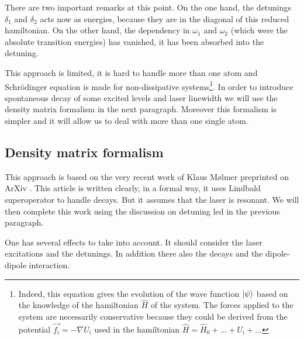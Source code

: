 \documentclass[twoside, open=right
]{scrreprt}
\newcommand{\om}{\omega}
\begin{document}
\par There are two important remarks at this point. On the one hand, the detunings $\delta_1$ and $\delta_2$ acts now as energies, because they are in the diagonal of this reduced hamiltonian. On the other hand, the dependency in $\om_1$ and $\om_2$ (which were the absolute transition energies) has vanished, it has been absorbed into the detuning.

\par This approach is limited, it is hard to handle more than one atom and Schrödinger equation is made for non-dissipative systems\footnote{Indeed, this equation gives the evolution of the wave function $\ket{\psi}$ based on the knowledge of the hamiltonian $\hat{H}$ of the system. The forces applied to the system are necessarily conservative because they could be derived from the potential $\vec{f_i} = - \nabla U_i$ used in the hamiltonian $\hat{H} = \hat{H}_0 + ... + U_i + ...$}. In order to introduce spontaneous decay of some excited levels and laser linewidth we will use the density matrix formalism in the next paragraph. Moreover this formalism is simpler and it will allow us to deal with more than one single atom.

\subsection{Density matrix formalism}

\par This approach is based on the very recent work of Klaus Mølmer preprinted on ArXiv \cite{Molmer}. This article is written clearly, in a formal way, it uses Lindbald superoperator to handle decays. But it assumes that the laser is resonant. We will then complete this work using the discussion on detuning led in the previous paragraph.

\par One has several effects to take into account. It should consider the laser excitations and the detunings. In addition there also the decays and the dipole-dipole interaction. 
\end{document}
